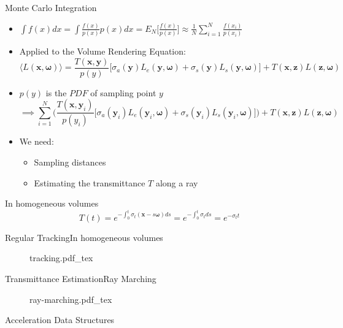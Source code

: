 \documentclass[
  english,            %
  aspectratio=169,    %
]{tumbeamer}
\newcommand\bx[0]{\textbf{x}}
\newcommand\by[0]{\textbf{y}}
\newcommand\bomega[0]{\boldsymbol{\omega}}
\begin{document}
\begin{frame}{Monte Carlo Integration}
\begin{itemize}
    \item $\int f(x)dx = \int \frac{f(x)}{p(x)}p(x) dx 
        = E_N\Big[ \frac{f(x)}{p(x)} \Big]
        \approx \frac{1}{N} \sum\limits_{i=1}^N \frac{f(x_i)}{p(x_i)}$
    \item Applied to the Volume Rendering Equation:
    $$\langle L(\bx, \bomega) \rangle = 
        \frac{T(\bx, \by)}{p(y)}
        \big[ 
            \sigma_a(\by)L_e(\by, \bomega) + 
            \sigma_s(\by)L_s(\by, \bomega)
        \big] 
        + 
        T(\bx, \textbf{z})L(\textbf{z},\bomega)$$
    \item $p(y)$ is the $PDF$ of sampling point $y$
        $$\implies
         \sum\limits_{i=1}^N \Big(
        \frac{T(\bx, \by_i)}{p(y_i)}
        \big[ 
            \sigma_a(\by_i)L_e(\by_i, \bomega) + 
            \sigma_s(\by_i)L_s(\by_i, \bomega)
        \big] \Big)
        + 
        T(\bx, \textbf{z})L(\textbf{z},\bomega)
        $$
    \item We need:
        \begin{itemize}
            \item Sampling distances
            \item Estimating the transmittance $T$ along a ray
        \end{itemize}
\end{itemize}
\end{frame}

\begin{frame}{In homogeneous volumes}
    $$T(t) = e^{-\int_0^t \sigma_t(\bx-s\bomega)ds} = e^{-\int_0^t \sigma_t ds} 
    = e^{-\sigma_t t}$$
\end{frame}


\begin{frame}{Regular Tracking}{In homogeneous volumes}
\begin{figure}[ht]
    \centering
    \def\svgwidth{\columnwidth}
    {tracking.pdf_tex}
\end{figure}
\end{frame}

\begin{frame}{Transmittance Estimation}{Ray Marching}
\begin{figure}[ht]
    \centering
    \def\svgwidth{0.6\columnwidth}
    {ray-marching.pdf_tex}
\end{figure}
\end{frame}

\begin{frame}{Acceleration Data Structures}
\end{frame}

\maketitle
\end{document}
